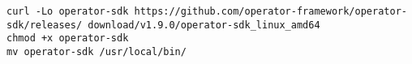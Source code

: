 \begin{verbatim}
curl -Lo operator-sdk https://github.com/operator-framework/operator-sdk/releases/ download/v1.9.0/operator-sdk_linux_amd64
chmod +x operator-sdk
mv operator-sdk /usr/local/bin/
\end{verbatim}
